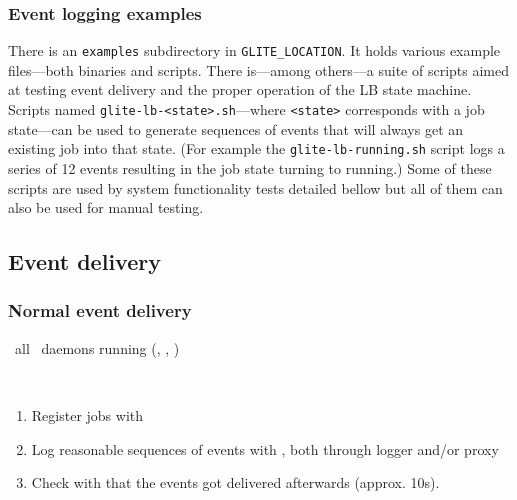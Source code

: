 \subsubsection{Event logging examples}

There is an {\tt examples} subdirectory in {\tt GLITE\_LOCATION}. It holds various example files---both binaries and scripts. There is---among others---a suite of scripts aimed at testing event delivery and the proper operation of the LB state machine. Scripts named {\tt glite-lb-<state>.sh}---where {\tt <state>} corresponds with a job state---can be used to generate sequences of events that will always get an existing job into that state. (For example the {\tt glite-lb-running.sh} script logs a series of 12 events resulting in the job state turning to running.) Some of these scripts are used by system functionality tests detailed bellow but all of them can also be used for manual testing.

\subsection{Event delivery}

\subsubsection{Normal event delivery}
\label{normal}

\req\ all \LB\ daemons running (, ,
)

\what\ 
\begin{enumerate}
\item Register jobs with  
\item Log reasonable sequences of events with , both through logger and/or proxy
\item Check with \code{edg\_wll\_JobLog} that the events got delivered afterwards (approx. 10s).
\end{enumerate}

\how\ 
%

